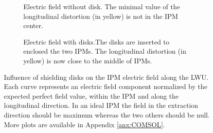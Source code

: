 \begin{figure}[!ht]
	\centering
	\begin{subfigure}[t]{0.7\textwidth}
		
		\caption[Electric field without disk]{Electric field without disk. The minimal value of the longitudinal distortion (in yellow) is not in the IPM center.}
		\label{chap3:no_disk}
	\end{subfigure}

	\begin{subfigure}[t]{0.7\textwidth}
		\centering
		
		\caption[Electric field with disks]{Electric field with disks.The disks are inserted to enclosed the two IPMs. The longitudinal distortion (in yellow) is now close to the middle of IPMs.}
		\label{chap3:disks}
	\end{subfigure}
	\caption[Influence of shielding disks on the IPM electric field]{Influence of shielding disks on the IPM electric field along the LWU. Each curve represents an electric field component normalized by the expected perfect field value, within the IPM and along the longitudinal direction. In an ideal IPM the field in the extraction direction should be maximum whereas the two others should be null. More plots are available in Appendix \ref{anx:COMSOL}.}
	\label{chap3:IPM_disk}
\end{figure}

